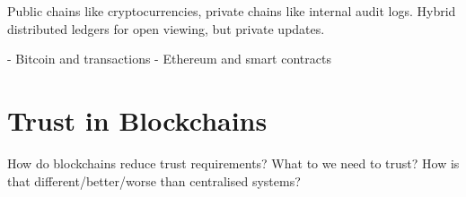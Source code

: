 Public chains like cryptocurrencies, private chains like internal audit logs. Hybrid distributed ledgers for open viewing, but private updates.

- Bitcoin and transactions
- Ethereum and smart contracts


\section{Trust in Blockchains}
\label{ch:blockchain:trust}

How do blockchains reduce trust requirements? What to we need to trust? How is that different/better/worse than centralised systems?
